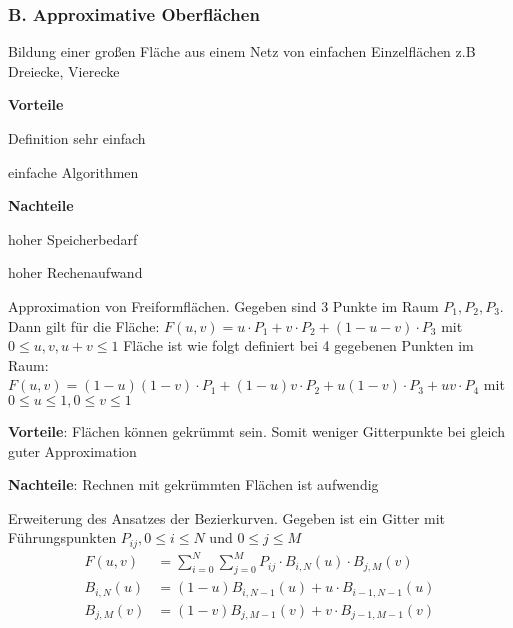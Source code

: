 \subsubsection{B. Approximative Oberflächen}
\begin{compactitem}
    \item Bildung einer großen Fläche aus einem Netz von einfachen Einzelflächen
    z.B Dreiecke, Vierecke
    \item \textbf{Vorteile}
    \begin{compactitem}
        \item Definition sehr einfach
        \item einfache Algorithmen
    \end{compactitem}
    \item \textbf{Nachteile}
    \begin{compactitem}
        \item hoher Speicherbedarf
        \item hoher Rechenaufwand
    \end{compactitem}
\end{compactitem}
Approximation von Freiformflächen. Gegeben sind 3 Punkte im Raum $P_1, P_2, P_3$. Dann gilt für die
Fläche: $F(u,v) = u \cdot P_1 + v \cdot P_2 + (1-u-v) \cdot P_3$ mit $0 \leq u,v,u+v \leq 1$
Fläche ist wie folgt definiert bei 4 gegebenen Punkten im Raum: $F(u,v) = (1-u)(1-v) \cdot P_1 +
(1-u)v \cdot P_2 + u(1-v) \cdot P_3 + uv \cdot P_4$ mit $0 \leq u \leq 1, 0 \leq v \leq 1$
\begin{compactitem}
    \item \textbf{Vorteile}: Flächen können gekrümmt sein. Somit weniger Gitterpunkte bei gleich guter
    Approximation
    \item \textbf{Nachteile}: Rechnen mit gekrümmten Flächen ist aufwendig
\end{compactitem}

Erweiterung des Ansatzes der Bezierkurven. Gegeben ist ein Gitter mit Führungspunkten $P_{ij},
0 \leq i \leq N$ und $0 \leq j \leq M$
\begin{align}
    F(u,v) &= \sum_{i=0}^N\sum_{j=0}^M  P_{ij} \cdot B_{i,N}(u) \cdot B_{j,M}(v) \\
    B_{i,N}(u) &= (1-u)B_{i,N-1}(u) + u \cdot B_{i-1,N-1}(u)  \\
    B_{j,M}(v) &= (1-v)B_{j,M-1}(v) + v \cdot B_{j-1,M-1}(v)
\end{align}
